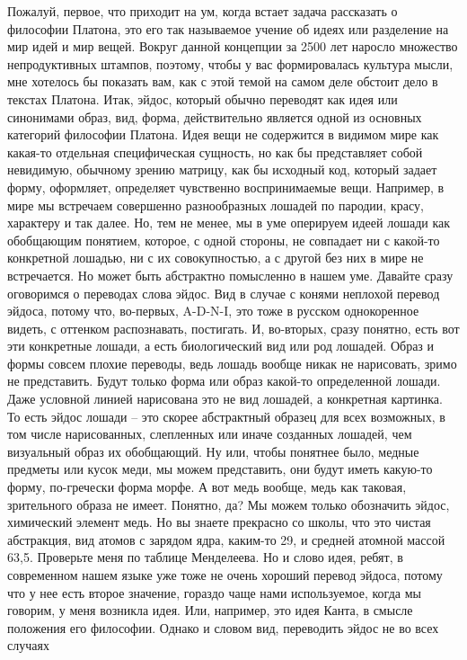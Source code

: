 Пожалуй, первое, что приходит на ум, когда встает задача рассказать о философии
Платона, это его так называемое учение об идеях или разделение на мир идей и мир
вещей. Вокруг данной концепции за 2500 лет наросло множество непродуктивных
штампов, поэтому, чтобы у вас формировалась культура мысли, мне хотелось бы
показать вам, как с этой темой на самом деле обстоит дело в текстах Платона.
Итак, эйдос, который обычно переводят как идея или синонимами образ, вид, форма,
действительно является одной из основных категорий философии Платона. Идея вещи
не содержится в видимом мире как какая-то отдельная специфическая сущность, но
как бы представляет собой невидимую, обычному зрению матрицу, как бы исходный
код, который задает форму, оформляет, определяет чувственно воспринимаемые вещи.
Например, в мире мы встречаем совершенно разнообразных лошадей по пародии,
красу, характеру и так далее. Но, тем не менее, мы в уме оперируем идеей лошади
как обобщающим понятием, которое, с одной стороны, не совпадает ни с какой-то
конкретной лошадью, ни с их совокупностью, а с другой без них в мире не
встречается. Но может быть абстрактно помысленно в нашем уме. Давайте сразу
оговоримся о переводах слова эйдос. Вид в случае с конями неплохой перевод
эйдоса, потому что, во-первых, A-D-N-I, это тоже в русском однокоренное видеть,
с оттенком распознавать, постигать. И, во-вторых, сразу понятно, есть вот эти
конкретные лошади, а есть биологический вид или род лошадей. Образ и формы
совсем плохие переводы, ведь лошадь вообще никак не нарисовать, зримо не
представить. Будут только форма или образ какой-то определенной лошади. Даже
условной линией нарисована это не вид лошадей, а конкретная картинка. То есть
эйдос лошади – это скорее абстрактный образец для всех возможных, в том числе
нарисованных, слепленных или иначе созданных лошадей, чем визуальный образ их
обобщающий. Ну или, чтобы понятнее было, медные предметы или кусок меди, мы
можем представить, они будут иметь какую-то форму, по-гречески форма морфе. А
вот медь вообще, медь как таковая, зрительного образа не имеет. Понятно, да? Мы
можем только обозначить эйдос, химический элемент медь. Но вы знаете прекрасно
со школы, что это чистая абстракция, вид атомов с зарядом ядра, каким-то 29, и
средней атомной массой 63,5. Проверьте меня по таблице Менделеева. Но и слово
идея, ребят, в современном нашем языке уже тоже не очень хороший перевод эйдоса,
потому что у нее есть второе значение, гораздо чаще нами используемое, когда мы
говорим, у меня возникла идея. Или, например, это идея Канта, в смысле положения
его философии. Однако и словом вид, переводить эйдос не во всех случаях
